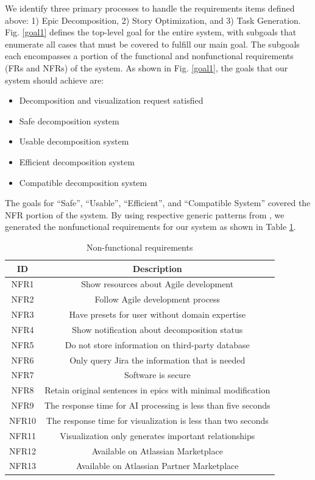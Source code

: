 We identify three primary processes to handle the requirements items defined above: 1) Epic Decomposition, 2) Story Optimization, and 3) Task Generation. Fig. \ref{goal1} defines the top-level goal for the entire system, with subgoals that enumerate all cases that must be covered to fulfill our main goal. The subgoals each encompasses a portion of the functional and nonfunctional requirements (FRs and NFRs) of the system. As shown in Fig. \ref{goal1}, the goals that our system should achieve are:

\begin{itemize}
	\item Decomposition and visualization request satisfied
	\item Safe decomposition system
	\item Usable decomposition system
	\item Efficient decomposition system
	\item Compatible decomposition system
\end{itemize}

The goals for “Safe”, “Usable”, “Efficient”, and “Compatible System” covered the NFR portion of the system. By using respective generic patterns from \cite{KAOS}, we generated the nonfunctional requirements for our system as shown in Table \ref{nfrs}.

\begin{table}
\centering
\caption{Non-functional requirements}
\label{nfrs}
\begin{tabular}{ |c|c| } 
\hline
\multicolumn{1}{|c|}{\textbf{ID}} & \multicolumn{1}{c|}{\textbf{Description}} \\
\hline
NFR1 & Show resources about Agile development \\
\hline
NFR2 & Follow Agile development process \\
\hline
NFR3 & Have presets for user without domain expertise \\
\hline
NFR4 & Show notification about decomposition status \\
\hline
NFR5 & Do not store information on third-party database \\
\hline
NFR6 & Only query Jira the information that is needed \\
\hline
NFR7 & Software is secure \\
\hline
NFR8 & Retain original sentences in epics with minimal modification \\
\hline
NFR9 & The response time for AI processing is less than five seconds \\
\hline
NFR10 & The response time for visualization is less than two seconds \\
\hline
NFR11 & Visualization only generates important relationships \\
\hline
NFR12 & Available on Atlassian Marketplace \\
\hline
NFR13 & Available on Atlassian Partner Marketplace \\
\hline
\end{tabular}
\end{table}

